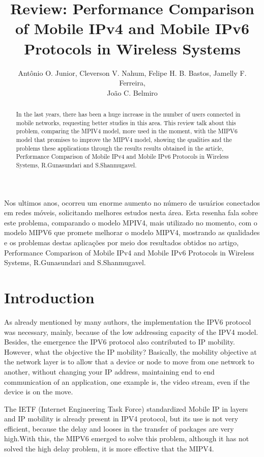 \documentclass[12pt]{article}
\title{Review: Performance Comparison of Mobile IPv4 and Mobile IPv6 Protocols in Wireless Systems}
\author{Antônio O. Junior\inst{1}, Cleverson V. Nahum\inst{1}, Felipe H. B. Bastos\inst{1}, Jamelly F. Ferreira\inst{1}, \\João C. Belmiro\inst{1} }
\begin{document}
 

\maketitle

\begin{abstract}
  In the last years, there has been a huge increase in the number of users connected in mobile networks, requesting better studies in this area. This review talk about this problem, comparing the MPIV4 model, more used in the
  moment, with the MIPV6 model that promises to improve the MIPV4 model, showing the qualities and the problems these   applications through the results results obtained in the article, Performance Comparison of Mobile IPv4 and
  Mobile IPv6 Protocols in Wireless Systems, R.Gunasundari and S.Shanmugavel.
\end{abstract}     
\begin{resumo} 
  Nos ultimos anos, ocorreu um enorme aumento no número de usuários conectados em redes móveis, solicitando melhores estudos nesta área. Esta resenha fala sobre este problema, comparando o modelo MPIV4, mais utilizado no momento, com o modelo MIPV6 que promete melhorar o modelo MIPV4, mostrando as qualidades e os problemas destas aplicações por meio dos resultados obtidos no artigo, Performance Comparison of Mobile IPv4 and Mobile IPv6 Protocols in Wireless Systems, R.Gunasundari and S.Shanmugavel.
\end{resumo}


\section{Introduction}

As already mentioned by many authors, the implementation the IPV6 protocol was necessary, mainly, because of the low addressing capacity of the IPV4 model.  Besides, the emergence the IPV6 protocol also contributed to IP mobility. However, what the objective the IP mobility? Basically, the mobility objective at the network layer is to allow that a device or node to move from one network to another, without changing your IP address, maintaining end to end communication of an application, one example is, the video stream, even if the device is on the move. 

The IETF (Internet Engineering Task Force) standardized Mobile IP in layers and IP mobility is already present in IPV4 protocol, but its use is not very efficient, because the delay and looses in the transfer of packages are very high.With this, the MIPV6 emerged to solve this problem, although it has not solved the high delay problem, it is more
effective that the MIPV4.
\end{document}
